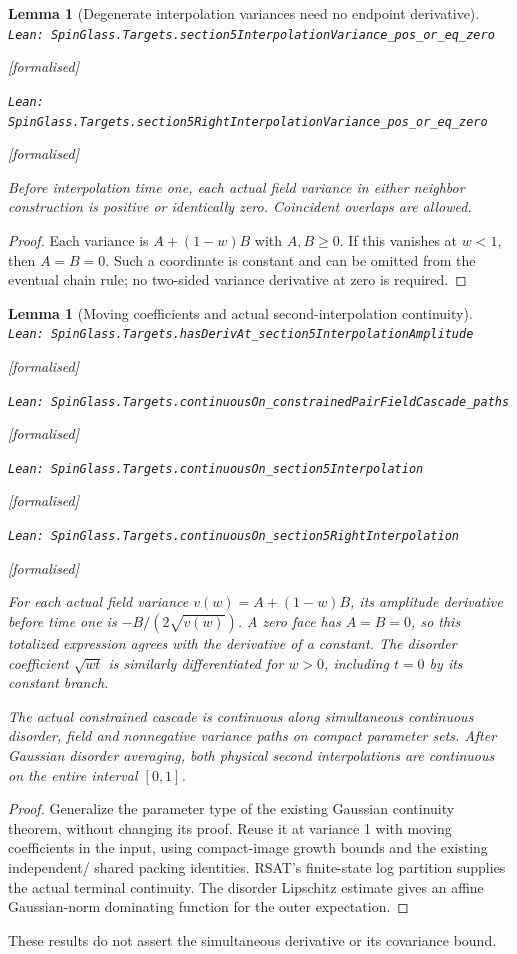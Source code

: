 \documentclass[11pt]{article}
\providecommand{\lean}[1]{\leavevmode\par\nopagebreak
  {\noindent\normalfont\footnotesize\raggedright\texttt{Lean: #1}\par}\nopagebreak}
\providecommand{\leanok}{\par\nopagebreak
  {\noindent\normalfont\footnotesize\textcolor{green!50!black}{[formalised]}\par}\nopagebreak}
\newtheorem{lemma}[theorem]{Lemma}
\begin{document}
\begin{lemma}[Degenerate interpolation variances need no endpoint derivative]
\lean{SpinGlass.Targets.section5InterpolationVariance\_pos\_or\_eq\_zero}\leanok
\lean{SpinGlass.Targets.section5RightInterpolationVariance\_pos\_or\_eq\_zero}\leanok
Before interpolation time one, each actual field variance in either neighbor
construction is positive or identically zero. Coincident overlaps are allowed.
\end{lemma}
\begin{proof}
Each variance is $A+(1-w)B$ with $A,B\ge0$. If this vanishes at $w<1$, then
$A=B=0$. Such a coordinate is constant and can be omitted from the eventual
chain rule; no two-sided variance derivative at zero is required.
\end{proof}

\begin{lemma}[Moving coefficients and actual second-interpolation continuity]
\lean{SpinGlass.Targets.hasDerivAt\_section5InterpolationAmplitude}\leanok
\lean{SpinGlass.Targets.continuousOn\_constrainedPairFieldCascade\_paths}\leanok
\lean{SpinGlass.Targets.continuousOn\_section5Interpolation}\leanok
\lean{SpinGlass.Targets.continuousOn\_section5RightInterpolation}\leanok
For each actual field variance $v(w)=A+(1-w)B$, its amplitude derivative
before time one is $-B/(2\sqrt{v(w)})$. A zero face has $A=B=0$, so this
totalized expression agrees with the derivative of a constant.
The disorder coefficient $\sqrt{wt}$ is similarly differentiated for $w>0$,
including $t=0$ by its constant branch.

The actual constrained cascade is continuous along simultaneous continuous
disorder, field and nonnegative variance paths on compact parameter sets.
After Gaussian disorder averaging, both physical second interpolations are
continuous on the entire interval $[0,1]$.
\end{lemma}
\begin{proof}
Generalize the parameter type of the existing Gaussian continuity theorem,
without changing its proof. Reuse it at variance 1 with moving coefficients
in the input, using compact-image growth bounds and the existing independent/
shared packing identities. RSAT's finite-state log partition supplies the
actual terminal continuity. The disorder Lipschitz estimate gives an affine
Gaussian-norm dominating function for the outer expectation.
\end{proof}
These results do not assert the simultaneous derivative or its covariance bound.
\end{document}
